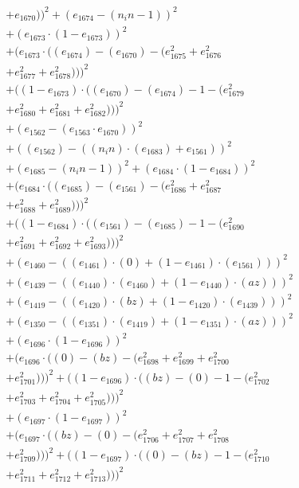 \documentclass[10pt, a4paper]{article}
\begin{document}
\begin{align*}
& + e_{1670}))^{2} + (e_{1674} - (n_in - 1))^{2} \\
& + (e_{1673}  \cdot  (1 - e_{1673}))^{2} \\
& + (e_{1673}  \cdot  ((e_{1674}) - (e_{1670}) - (e_{1675}^{2} + e_{1676}^{2} \\
& + e_{1677}^{2} + e_{1678}^{2})))^{2} \\
& + ((1 - e_{1673})  \cdot  ((e_{1670}) - (e_{1674}) - 1 - (e_{1679}^{2} \\
& + e_{1680}^{2} + e_{1681}^{2} + e_{1682}^{2})))^{2} \\
& + (e_{1562} - (e_{1563}  \cdot  e_{1670}))^{2} \\
& + ((e_{1562}) - ((n_in)  \cdot  (e_{1683}) + e_{1561}))^{2} \\
& + (e_{1685} - (n_in - 1))^{2} + (e_{1684}  \cdot  (1 - e_{1684}))^{2} \\
& + (e_{1684}  \cdot  ((e_{1685}) - (e_{1561}) - (e_{1686}^{2} + e_{1687}^{2} \\
& + e_{1688}^{2} + e_{1689}^{2})))^{2} \\
& + ((1 - e_{1684})  \cdot  ((e_{1561}) - (e_{1685}) - 1 - (e_{1690}^{2} \\
& + e_{1691}^{2} + e_{1692}^{2} + e_{1693}^{2})))^{2} \\
& + (e_{1460} - ((e_{1461})  \cdot  (0) + (1 - e_{1461})  \cdot  (e_{1561})))^{2} \\
& + (e_{1439} - ((e_{1440})  \cdot  (e_{1460}) + (1 - e_{1440})  \cdot  (az)))^{2} \\
& + (e_{1419} - ((e_{1420})  \cdot  (bz) + (1 - e_{1420})  \cdot  (e_{1439})))^{2} \\
& + (e_{1350} - ((e_{1351})  \cdot  (e_{1419}) + (1 - e_{1351})  \cdot  (az)))^{2} \\
& + (e_{1696}  \cdot  (1 - e_{1696}))^{2} \\
& + (e_{1696}  \cdot  ((0) - (bz) - (e_{1698}^{2} + e_{1699}^{2} + e_{1700}^{2} \\
& + e_{1701}^{2})))^{2} + ((1 - e_{1696})  \cdot  ((bz) - (0) - 1 - (e_{1702}^{2} \\
& + e_{1703}^{2} + e_{1704}^{2} + e_{1705}^{2})))^{2} \\
& + (e_{1697}  \cdot  (1 - e_{1697}))^{2} \\
& + (e_{1697}  \cdot  ((bz) - (0) - (e_{1706}^{2} + e_{1707}^{2} + e_{1708}^{2} \\
& + e_{1709}^{2})))^{2} + ((1 - e_{1697})  \cdot  ((0) - (bz) - 1 - (e_{1710}^{2} \\
& + e_{1711}^{2} + e_{1712}^{2} + e_{1713}^{2})))^{2} \\

\end{align*}
\end{document}
